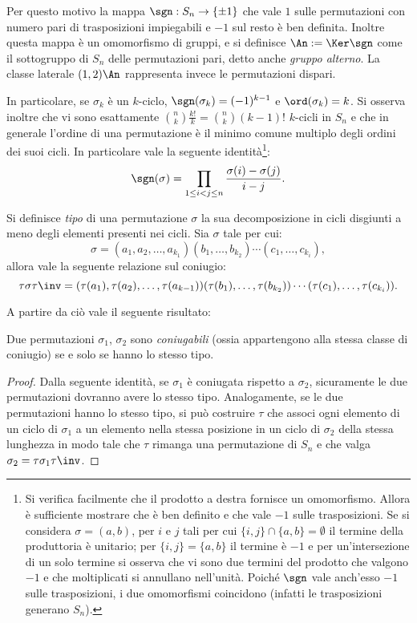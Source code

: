 \documentclass[12pt]{scrartcl}
\begin{document}
	Per questo motivo la mappa $\sgn : S_n \to \{\pm 1\}$ che vale $1$ sulle
	permutazioni con numero pari di trasposizioni impiegabili e $-1$ sul resto
	è ben definita. Inoltre questa mappa è un omomorfismo di gruppi, e si
	definisce $\An := \Ker \sgn$ come il sottogruppo di $S_n$ delle permutazioni
	pari, detto anche \textit{gruppo alterno}. La classe laterale $(1, 2) \An$
	rappresenta invece le permutazioni dispari. \medskip
	
	
	In particolare, se $\sigma_k$ è un $k$-ciclo, $\sgn(\sigma_k) = (-1)^{k-1}$ e $\ord(\sigma_k) = k$. Si osserva inoltre che vi sono esattamente $\binom{n}{k} \frac{k!}{k} =
	\binom{n}{k} (k-1)!$ $k$-cicli in $S_n$ e che in generale l'ordine
	di una permutazione è il minimo comune multiplo degli
	ordini dei suoi cicli. In particolare vale la seguente identità\footnote{
		Si verifica facilmente che il prodotto a destra fornisce un omomorfismo. Allora
		è sufficiente mostrare che è ben definito e che vale $-1$ sulle trasposizioni.
		Se si considera $\sigma = (a, b)$, per $i$ e $j$ tali per cui
		$\{i, j\} \cap \{a, b\} = \emptyset$ il termine della produttoria è unitario;
		per $\{i, j\} = \{a, b\}$ il termine è $-1$ e per un'intersezione di un solo
		termine si osserva che vi sono due termini del prodotto che valgono $-1$ e
		che moltiplicati si annullano nell'unità. Poiché $\sgn$ vale anch'esso $-1$ sulle trasposizioni, i due omomorfismi coincidono (infatti le trasposizioni generano $S_n$).
	}:
	\[ \sgn(\sigma) = \prod_{1 \leq i < j \leq n} \frac{\sigma(i) - \sigma(j)}{i - j}. \]

	Si definisce \textit{tipo} di una permutazione $\sigma$ la sua decomposizione
	in cicli disgiunti a meno degli elementi presenti nei cicli. Sia $\sigma$
	tale per cui:
	\[ \sigma = (a_1, a_2, \ldots, a_{k_1}) (b_1, \ldots, b_{k_2}) \cdots (c_1, \ldots, c_{k_i}), \]
	allora vale la seguente relazione sul coniugio:
	\[ \tau \sigma \tau\inv = (\tau(a_1), \tau(a_2), \ldots, \tau(a_{k-1})) (\tau(b_1), \ldots, \tau(b_{k_2})) \cdots (\tau(c_1), \ldots, \tau(c_{k_i})). \]
	
	A partire da ciò vale il seguente risultato:
	\begin{proposition}
		Due permutazioni $\sigma_1$, $\sigma_2$ sono \textit{coniugabili}
		(ossia appartengono alla stessa classe di coniugio) se e solo se
		hanno lo stesso tipo.
	\end{proposition}
	
	\begin{proof}
		Dalla seguente identità, se $\sigma_1$ è coniugata rispetto a
		$\sigma_2$, sicuramente le due permutazioni dovranno avere lo stesso
		tipo. Analogamente, se le due permutazioni hanno lo stesso tipo,
		si può costruire $\tau$ che associ ogni elemento di
		un ciclo di $\sigma_1$ a un elemento nella stessa posizione in un ciclo
		di $\sigma_2$ della stessa lunghezza in modo tale che $\tau$ rimanga
		una permutazione di $S_n$ e che valga $\sigma_2 = \tau \sigma_1 \tau\inv$.
	\end{proof}
	
\end{document}
